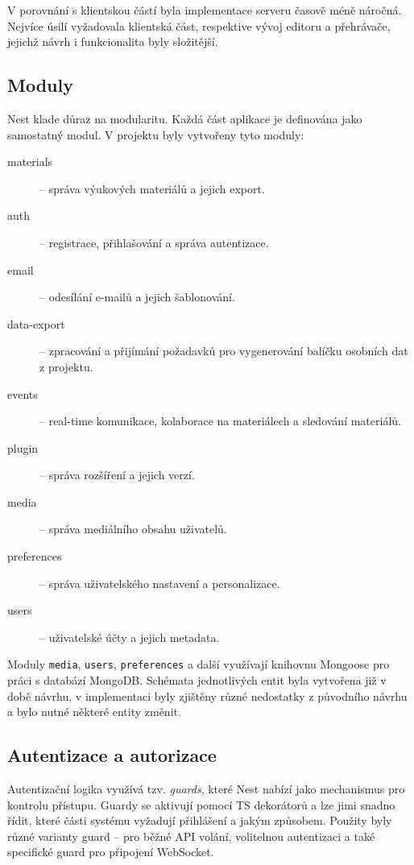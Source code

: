 V porovnání s klientskou částí byla implementace serveru časově méně náročná.
Nejvíce úsilí vyžadovala klientská část, respektive vývoj editoru a přehrávače, jejichž návrh i funkcionalita byly složitější.

\subsection{Moduly}

Nest klade důraz na modularitu. Každá část aplikace je definována jako samostatný modul. V projektu byly vytvořeny tyto moduly:

\begin{description}
    \item[materials] -- správa výukových materiálů a jejich export.
    \item[auth] -- registrace, přihlašování a správa autentizace.
    \item[email] -- odesílání e-mailů a jejich šablonování.
    \item[data-export] -- zpracování a přijímání požadavků pro vygenerování balíčku osobních dat z projektu.
    \item[events] -- real-time komunikace, kolaborace na materiálech a sledování materiálů.
    \item[plugin] -- správa rozšíření a jejich verzí.
    \item[media] -- správa mediálního obsahu uživatelů. 
    \item[preferences] -- správa uživatelského nastavení a personalizace.
    \item[users] -- uživatelské účty a jejich metadata.
\end{description}

Moduly \texttt{media}, \texttt{users}, \texttt{preferences} a další využívají knihovnu Mongoose pro práci s databází MongoDB. 
Schémata jednotlivých entit byla vytvořena již v době návrhu, v implementaci byly zjištěny různé nedostatky z původního návrhu a bylo nutné některé entity změnit.

\subsection{Autentizace a autorizace}

Autentizační logika využívá tzv. \emph{guards}, které Nest nabízí jako mechanismus pro kontrolu přístupu.
Guardy se aktivují pomocí TS dekorátorů a lze jimi snadno řídit, které části systému vyžadují přihlášení a jakým způsobem. 
Použity byly různé varianty guard -- pro běžné API volání, volitelnou autentizaci a také specifické guard pro připojení WebSocket.

